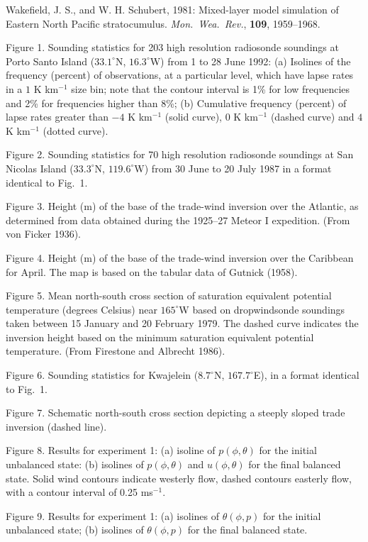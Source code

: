 Wakefield, J. S., and W. H. Schubert, 1981:  Mixed-layer model simulation of
Eastern North Pacific stratocumulus.  {\sl Mon.\ Wea.\ Rev.}, {\bf 109},
1959--1968.


\endreferences


\begincaptions


Figure 1. Sounding statistics for 203 high resolution radiosonde soundings at
Porto Santo Island ($33.1^\circ$N, $16.3^\circ$W) from 1 to 28 June 1992: (a)
Isolines of the frequency (percent) of observations, at a particular level,
which have lapse rates in a $1$ K km$^{-1}$ size bin; note that the contour
interval is 1\% for low frequencies and 2\% for frequencies higher than 8\%;  
(b)  Cumulative frequency (percent) of lapse rates greater than $-4$ K
km$^{-1}$ (solid curve), $0$ K km$^{-1}$ (dashed curve) and $4$ K km$^{-1}$
(dotted curve).

Figure 2.  Sounding statistics for 70 high resolution radiosonde soundings at 
San Nicolas Island ($33.3^\circ$N, $119.6^\circ$W) from 30 June to 20 July
1987 in a format identical to Fig.~1.

Figure 3. Height (m) of the base of the trade-wind inversion over the
Atlantic,  as determined from data obtained during the 1925--27 Meteor I
expedition. (From von Ficker 1936).

Figure 4. Height (m) of the base of the trade-wind inversion over the
Caribbean for April.  The map is based on the tabular data of Gutnick (1958).

Figure 5.  Mean north-south cross section of saturation equivalent potential
temperature (degrees Celsius) near $165^\circ$W based on dropwindsonde
soundings taken between 15 January and 20 February 1979.  The dashed curve
indicates the inversion height based on the minimum saturation equivalent
potential temperature.  (From Firestone and Albrecht 1986).

Figure 6.  Sounding statistics for Kwajelein ($8.7^\circ$N, $167.7^\circ$E),
in a format identical to Fig.~1.

Figure 7. Schematic north-south cross section depicting a steeply sloped trade
inversion (dashed line).

Figure 8. Results for experiment 1: (a) isoline of $p(\phi,\theta)$ for the
initial unbalanced state: (b) isolines of $p(\phi,\theta)$ and
$u(\phi,\theta)$
for the final balanced state. Solid wind contours indicate westerly flow,
dashed contours easterly flow, with a contour interval of 0.25 ms$^{-1}$.

Figure 9. Results for experiment 1: (a) isolines of $\theta(\phi,p)$ for the
initial unbalanced state;
(b) isolines of $\theta(\phi,p)$ for the final balanced state.

